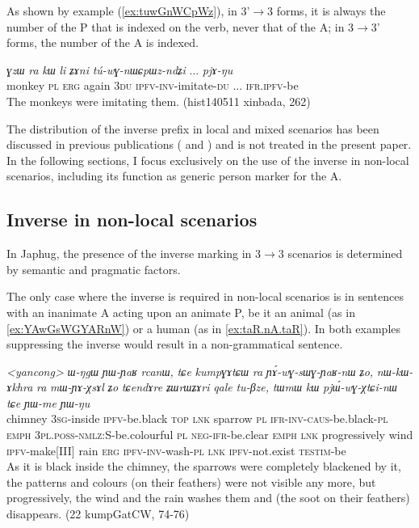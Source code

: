 \documentclass[oneside,a4paper,11pt]{article}
\newcommand{\ipa}[1]{\textit{\phon\mbox{#1}}} %
\newcommand{\refb}[1]{(\ref{#1})}
\begin{document}
As shown by example \refb{ex:tuwGnWCpWz}, in 3'$\rightarrow$3 forms, it is always the number of the P that is indexed on the verb, never that of the A; in 3$\rightarrow$3' forms, the number of the A is indexed.

\begin{exe}
\ex \label{ex:tuwGnWCpWz}
\gll 
\ipa{ɣzɯ} 	\ipa{ra} 	\ipa{kɯ} 	\ipa{li} 	\ipa{ʑɤni} 	\ipa{tú-wɣ-nɯɕpɯz-ndʑi} ... \ipa{pjɤ-ŋu} \\
monkey \textsc{pl} \textsc{erg} again \textsc{3du} \textsc{ipfv-inv}-imitate-\textsc{du} ... \textsc{ifr.ipfv}-be \\
 \glt The monkeys were imitating them.  (hist140511 xinbada, 262)
\end{exe}

The distribution of the inverse prefix in local and mixed scenarios has been discussed in previous publications (\citealt{jacques10inverse} and \citealt{jacques14inverse}) and is not treated in the present paper. In the following sections, I focus exclusively on the use of the inverse in non-local scenarios, including its function as generic person marker for the A.

\subsection{Inverse in non-local scenarios} \label{sec:obv.jpg}
In Japhug, the presence of the inverse marking in  3$\rightarrow$3 scenarios is determined by semantic and pragmatic factors. 

The only case where the inverse is required in non-local scenarios is in sentences with an inanimate A acting upon an animate P, be it an animal (as in \ref{ex:YAwGsWGYARnW}) or a human (as in \ref{ex:taR.nA.taR}). In both examples suppressing the inverse would result in a non-grammatical sentence.  
 

 \begin{exe}
\ex \label{ex:YAwGsWGYARnW} 
\gll
\textit{<yancong>}	\ipa{ɯ-ŋgɯ} 	\ipa{ɲɯ-ɲaʁ} 	\ipa{rcanɯ,} 	\ipa{tɕe} 	\ipa{kumpɣɤtɕɯ} 	\ipa{ra} 	\ipa{ɲɤ́-wɣ-sɯɣ-ɲaʁ-nɯ} 	\ipa{ʑo,} 	\ipa{nɯ-kɯ-ɤkhra} 	\ipa{ra} 	\ipa{mɯ-ɲɤ-χsɤl} 	\ipa{ʑo} 	\ipa{tɕendɤre} 	\ipa{ʑɯrɯʑɤri} 	\ipa{qale} 	\ipa{tu-βze,} 	\ipa{tɯmɯ} 	\ipa{kɯ} 	\ipa{pjɯ́-wɣ-χtɕi-nɯ} 	\ipa{tɕe} 	\ipa{ɲɯ-me} 	\ipa{ɲɯ-ŋu} \\
chimney \textsc{3sg}-inside \textsc{ipfv}-be.black \textsc{top} \textsc{lnk} sparrow \textsc{pl} \textsc{ifr-inv-caus}-be.black-\textsc{pl} \textsc{emph} \textsc{3pl.poss-nmlz}:S-be.colourful \textsc{pl} \textsc{neg-ifr}-be.clear \textsc{emph} \textsc{lnk} progressively wind \textsc{ipfv}-make[III] rain \textsc{erg} \textsc{ipfv-inv}-wash-\textsc{pl} \textsc{lnk} \textsc{ipfv}-not.exist \textsc{testim}-be \\
\glt As it is black inside the chimney, the sparrows were completely blackened by it, the patterns and colours (on their feathers) were not visible any more, but progressively, the wind and the rain washes them and (the soot on their feathers) disappears.
 (22 kumpGatCW, 74-76)
\end{exe}
\end{document}
